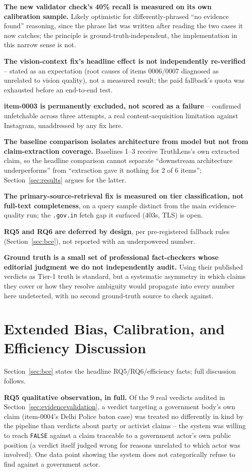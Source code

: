 \documentclass[conference]{IEEEtran}
\begin{document}
\textbf{The new validator check's 40\% recall is measured on its own
calibration sample.} Likely optimistic for differently-phrased ``no
evidence found'' reasoning, since the phrase list was written after
reading the two cases it now catches; the principle is
ground-truth-independent, the implementation in this narrow sense is not.

\textbf{The vision-context fix's headline effect is not independently
re-verified} -- stated as an expectation (root causes of items 0006/0007
diagnosed as unrelated to vision quality), not a measured result; the
paid fallback's quota was exhausted before an end-to-end test.

\textbf{item-0003 is permanently excluded, not scored as a failure} --
confirmed unfetchable across three attempts, a real content-acquisition
limitation against Instagram, unaddressed by any fix here.

\textbf{The baseline comparison isolates architecture from model but not
from claim-extraction coverage.} Baselines 1--3 receive TruthLens's own
extracted claim, so the headline comparison cannot separate ``downstream
architecture underperforms'' from ``extraction gave it nothing for 2 of 6
items''; Section~\ref{sec:results} argues for the latter.

\textbf{The primary-source-retrieval fix is measured on tier
classification, not full-text completeness}, on a query sample distinct
from the main evidence-quality run; the \texttt{.gov.in} fetch gap it
surfaced (403s, TLS) is open.

\textbf{RQ5 and RQ6 are deferred by design}, per pre-registered fallback
rules (Section~\ref{sec:bce}), not reported with an underpowered number.

\textbf{Ground truth is a small set of professional fact-checkers whose
editorial judgment we do not independently audit.} Using their published
verdicts as Tier-1 truth is standard, but a systematic asymmetry in which
claims they cover or how they resolve ambiguity would propagate into
every number here undetected, with no second ground-truth source to
check against.

\section{Extended Bias, Calibration, and Efficiency Discussion}
\label{sec:appendixbce}
Section~\ref{sec:bce} states the headline RQ5/RQ6/efficiency facts; full
discussion follows.

\textbf{RQ5 qualitative observation, in full.} Of the 9 real verdicts
audited in Section~\ref{sec:evidencevalidation}, a verdict targeting a
government body's own claim (item-0004's Delhi Police baton case) was
treated no differently in kind by the pipeline than verdicts about party
or activist claims -- the system was willing to reach \texttt{FALSE}
against a claim traceable to a government actor's own public position (a
verdict itself judged wrong for reasons unrelated to which actor was
involved). One data point showing the system does not categorically
refuse to find against a government actor.
\end{document}
